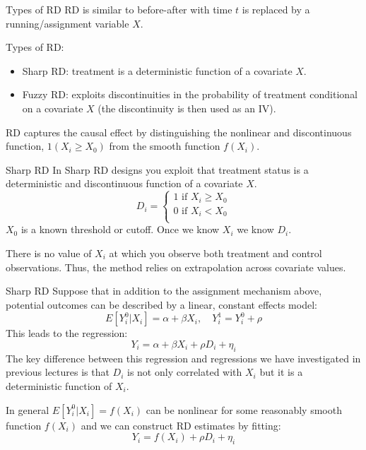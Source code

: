 \documentclass[handout]{beamer}
\begin{document}
\begin{frame}{Types of RD}
	RD is similar to before-after with time $t$ is replaced by a running/assignment variable $X$.\bigskip
	
	Types of RD:\begin{itemize}
		\item Sharp RD: treatment is a deterministic function of a covariate $X$.
		\item Fuzzy RD: exploits discontinuities in the probability of treatment conditional on a covariate $X$ (the discontinuity is then used as an IV).
	\end{itemize}\bigskip
	
	RD captures the causal effect by distinguishing the nonlinear and
	discontinuous function, $1(X_i \ge X_0)$ from the smooth function $f (X_i)$.
\end{frame}

\begin{frame}{Sharp RD}
	In Sharp RD designs you exploit that treatment status is a deterministic and discontinuous function of a covariate $X$.
	\[D_i=\begin{cases*}
	1 \text{ if } X_i\ge X_0\\
	0 \text{ if } X_i< X_0\\
		\end{cases*}\]
	$X_0$ is a known threshold or cutoff. Once we know $X_i$ we know $D_i$.\bigskip
	
	There is no value of $X_i$
	at which you observe both treatment and control observations. Thus, the method relies on extrapolation across covariate values.\medskip
	
\end{frame}

\begin{frame}{Sharp RD}
	Suppose that in addition to the assignment mechanism above,
	potential outcomes can be described by a linear, constant effects
	model:
	\[E[Y^0_i|X_i ] = \alpha + \beta X_i, \quad
	Y^1_i = Y^0_i + \rho\]
	This leads to the regression:
	\[Y_i = \alpha + \beta X_i + \rho D_i + \eta_i\]
	The key difference between this regression and regressions we have
	investigated in previous lectures is that $D_i$ is not only correlated with $X_i$ but it is a deterministic function of $X_i$.\bigskip
	
	In general $E[Y^0_i|X_i ] = f (X_i)$ can be nonlinear for some 	reasonably smooth function $f (X_i )$ and we can construct RD estimates by fitting:
	\[Y_i = f(X_i) + \rho D_i + \eta_i\]
\end{frame}
\end{document}

